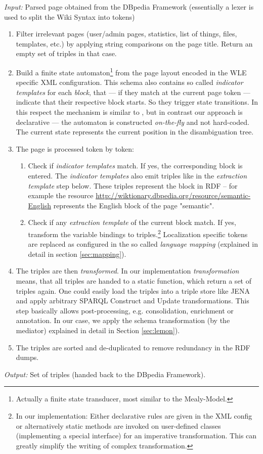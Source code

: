 \textit{Input:} Parsed page obtained from the DBpedia Framework (essentially a lexer is used to split the Wiki Syntax into tokens)
\begin{enumerate}
\item Filter irrelevant pages (user/admin pages, statistics, list of things, files, templates, etc.) by applying string comparisons on the page title. 
Return an empty set of triples in that case.
\item Build a finite state automaton\footnote{Actually a finite state transducer, most similar to the Mealy-Model.} from the page layout encoded in the WLE specific XML configuration. 
This schema also contains so called \textit{indicator templates} for each \textit{block}, that --- if they match at the current page token --- indicate that their respective block starts. 
So they trigger state transitions. 
In this respect the mechanism is similar to \cite{McCrae_2012}, but in contrast our approach is declarative --- the automaton is constructed \textit{on-the-fly} and not hard-coded. 
The current state represents the current position in the disambiguation tree.
\item The page is processed token by token:
\begin{enumerate}
\item Check if \textit{indicator templates} match. 
If yes, the corresponding block is entered. 
The \textit{indicator templates} also emit triples like in the \textit{extraction template} step below. 
These triples represent the block in RDF -- for example the resource \url{http://wiktionary.dbpedia.org/resource/semantic-English} represents the English block of the page "semantic".
\item Check if any \textit{extraction template} of the current block match.
\subitem If yes, transform the variable bindings to triples.\footnote{In our implementation: 
Either declarative rules are given in the XML config or alternatively static methods are invoked on user-defined classes (implementing a special interface) for an imperative transformation. This can greatly simplify the writing of complex transformation.} Localization specific tokens are replaced as configured in the so called \textit{language mapping} (explained in detail in section \ref{sec:mapping}).
\end{enumerate}
\item The triples are then \textit{transformed}. 
In our implementation \textit{transformation} means, that all triples are handed to a static function, which return a set of triples again. 
One could easily load the triples into a triple store like JENA and apply arbitrary SPARQL Construct and Update transformations. 
This step basically allows post-processing, e.g. consolidation, enrichment or annotation. 
In our case, we apply the schema transformation (by the mediator) explained in detail in Section \ref{sec:lemon}).
\item The triples are sorted and de-duplicated to remove redundancy in the RDF dumps.
\end{enumerate}
\textit{Output:} Set of triples (handed back to the DBpedia Framework).

